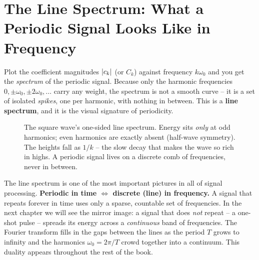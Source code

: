 \section{The Line Spectrum: What a Periodic Signal Looks Like in Frequency}

Plot the coefficient magnitudes \(\lvert c_k\rvert\) (or \(C_k\)) against frequency \(k\omega_0\)
and you get the \emph{spectrum} of the periodic signal. Because only the harmonic
frequencies \(0, \pm\omega_0, \pm2\omega_0,\dots\) carry any weight, the spectrum is not a
smooth curve -- it is a set of isolated \emph{spikes}, one per harmonic, with nothing in
between. This is a \textbf{line spectrum}, and it is the visual signature of periodicity.

\begin{figure}[H]
\centering
{}
\caption{The square wave's one-sided line spectrum. Energy sits \emph{only} at odd
harmonics; even harmonics are exactly absent (half-wave symmetry). The heights fall as
$1/k$ -- the slow decay that makes the wave so rich in highs. A periodic signal lives on a
discrete comb of frequencies, never in between.}
\label{ch06:fig-line}
\end{figure}

\begin{aestheticbox}
The line spectrum is one of the most important pictures in all of signal processing.
\textbf{Periodic in time \(\Leftrightarrow\) discrete (line) in frequency.} A signal that
repeats forever in time uses only a sparse, countable set of frequencies. In the next
chapter we will see the mirror image: a signal that does \emph{not} repeat -- a one-shot
pulse -- spreads its energy across a \emph{continuous} band of frequencies. The Fourier
transform fills in the gaps between the lines as the period \(T\) grows to infinity and
the harmonics \(\omega_0 = 2\pi/T\) crowd together into a continuum. This duality
appears throughout the rest of the book.
\end{aestheticbox}

